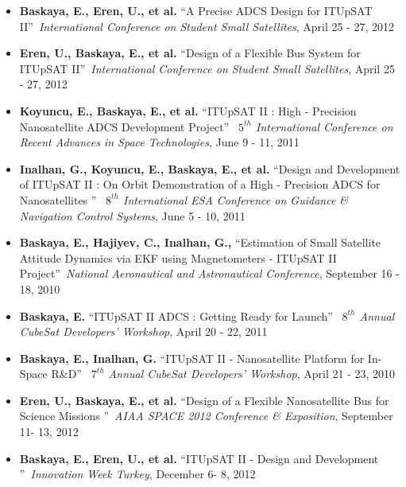 \begin{itemize}
     \item \textbf{Baskaya, E., Eren, U., et al.} \textquotedblleft A Precise ADCS Design for ITUpSAT II\textquotedblright\ \emph{International Conference on Student Small Satellites}, April 25 - 27, 2012

     \item \textbf{Eren,  U., Baskaya, E., et al.} \textquotedblleft Design of a Flexible Bus System for ITUpSAT II\textquotedblright\ \emph{International Conference on Student Small Satellites}, April 25 - 27, 2012

     \item \textbf{Koyuncu, E., Baskaya, E., et al.} \textquotedblleft ITUpSAT II : High - Precision Nanosatellite ADCS Development Project\textquotedblright\ \emph{ $5^{th}$ International Conference on Recent Advances in Space Technologies}, June 9 - 11, 2011

     \item \textbf{Inalhan, G., Koyuncu, E., Baskaya, E., et al.} \textquotedblleft Design and Development of ITUpSAT II : On Orbit Demonstration of a High - Precision ADCS for Nanosatellites \textquotedblright\ \emph{ $8^{th}$ International ESA Conference on Guidance \& Navigation Control Systems}, June 5 - 10, 2011

     \item \textbf{Baskaya, E., Hajiyev, C., Inalhan, G.,} \textquotedblleft Estimation of Small Satellite Attitude Dynamics via EKF using Magnetometers - ITUpSAT II Project\textquotedblright\ \emph{National Aeronautical and Astronautical Conference}, September 16 - 18, 2010
\vspace*{-.05in}

     \item \textbf{Baskaya, E.} \textquotedblleft ITUpSAT II ADCS : Getting Ready for Launch\textquotedblright\ \emph{ $8^{th}$ Annual CubeSat Developers' Workshop}, April 20 - 22, 2011
\vspace*{-.05in}


     \item \textbf{Baskaya, E., Inalhan, G.} \textquotedblleft ITUpSAT II - Nanosatellite Platform for In-Space R\&D\textquotedblright\ \emph{ $7^{th}$ Annual CubeSat Developers' Workshop}, April 21 - 23, 2010
\vspace*{-.05in}


     \item \textbf{Eren, U., Baskaya, E., et al.} \textquotedblleft Design of a Flexible Nanosatellite Bus for Science Missions \textquotedblright\ \emph{AIAA SPACE 2012 Conference \& Exposition}, September 11- 13, 2012

     \item \textbf{Baskaya, E., Eren, U., et al.} \textquotedblleft ITUpSAT II - Design and Development \textquotedblright\ \emph{Innovation Week Turkey}, December 6- 8, 2012

\end{itemize}

\newpage{\cleardoublepage}
